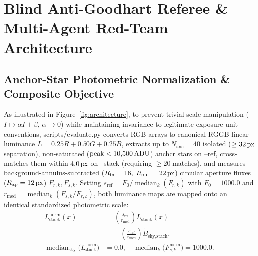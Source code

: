 \documentclass[10pt,twocolumn,letterpaper]{article}
\DeclareRobustCommand{\code}[1]{\texttt{#1}}
\def\code#1{#1}%
\def\bm#1{#1}%
\def\allowbreak{}%
\begin{document}
\section{Blind Anti-Goodhart Referee \& Multi-Agent Red-Team Architecture}
\label{sec:referee}

\subsection{Anchor-Star Photometric Normalization \& Composite Objective}

As illustrated in Figure~\ref{fig:architecture}, to prevent trivial scale manipulation ($I \mapsto \alpha I + \beta$, $\alpha \to 0$) while maintaining invariance to legitimate exposure-unit conventions, \code{scripts/\allowbreak evaluate.py} converts RGB arrays to canonical RGGB linear luminance $L = 0.25 R + 0.50 G + 0.25 B$, extracts up to $N_{\text{anc}} = 40$ isolated ($\ge 32\text{\,px}$ separation), non-saturated ($\text{peak} < 10{,}500\text{\,ADU}$) anchor stars on \code{--ref}, cross-matches them within $4.0\text{\,px}$ on \code{--stack} (requiring $\ge 20$ matches), and measures background-annulus-subtracted ($R_{\text{in}}=16,\; R_{\text{out}}=22\text{\,px}$) circular aperture fluxes ($R_{\text{ap}}=12\text{\,px}$) $F_{r,k}, F_{s,k}$. Setting $s_{\text{ref}} = F_0 / \operatorname{median}_k(F_{r,k})$ with $F_0 = 1000.0$ and $r_{\text{med}} = \operatorname{median}_k(F_{s,k}/F_{r,k})$, both luminance maps are mapped onto an identical standardized photometric scale:
\begin{equation}
  \begin{aligned}
    L_{\text{stack}}^{\text{norm}}(\bm{x}) &= \left(\frac{s_{\text{ref}}}{r_{\text{med}}}\right) L_{\text{stack}}(\bm{x}) \\
    &\quad - \left(\frac{s_{\text{ref}}}{r_{\text{med}}}\right) \tilde{B}_{\text{sky,stack}}, \\
    \operatorname{median}_{\text{sky}}\!\big(L_{\text{stack}}^{\text{norm}}\big) &= 0.0, \quad
    \operatorname{median}_{k}\!\big(F_{s,k}^{\text{norm}}\big) = 1000.0.
  \end{aligned}
  \label{eq:phot_norm}
\end{equation}
\end{document}
